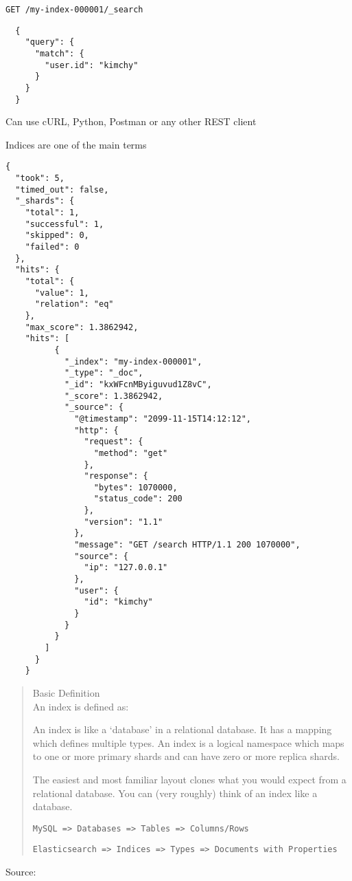 \documentclass[Screen16to9,17pt]{foils}
\begin{document}


\verb+GET /my-index-000001/_search+
\begin{verbatim}
  {
    "query": {
      "match": {
        "user.id": "kimchy"
      }
    }
  }
\end{verbatim}


\begin{list2}
\item Can use cURL, Python, Postman or any other REST client
\item Indices are one of the main terms
\end{list2}



\begin{verbatim}
{
  "took": 5,
  "timed_out": false,
  "_shards": {
    "total": 1,
    "successful": 1,
    "skipped": 0,
    "failed": 0
  },
  "hits": {
    "total": {
      "value": 1,
      "relation": "eq"
    },
    "max_score": 1.3862942,
    "hits": [
          {
            "_index": "my-index-000001",
            "_type": "_doc",
            "_id": "kxWFcnMByiguvud1Z8vC",
            "_score": 1.3862942,
            "_source": {
              "@timestamp": "2099-11-15T14:12:12",
              "http": {
                "request": {
                  "method": "get"
                },
                "response": {
                  "bytes": 1070000,
                  "status_code": 200
                },
                "version": "1.1"
              },
              "message": "GET /search HTTP/1.1 200 1070000",
              "source": {
                "ip": "127.0.0.1"
              },
              "user": {
                "id": "kimchy"
              }
            }
          }
        ]
      }
    }
\end{verbatim}




\begin{quote}
Basic Definition\\
An index is defined as:

An index is like a ‘database’ in a relational database. It has a mapping which defines multiple types.
An index is a logical namespace which maps to one or more primary shards and can have zero or more replica shards.

\vskip 5mm

The easiest and most familiar layout clones what you would expect from a relational database. You can (very roughly) think of an index like a database.

\verb+MySQL => Databases => Tables => Columns/Rows+

\verb+Elasticsearch => Indices => Types => Documents with Properties+
\end{quote}
Source: 
\end{document}
